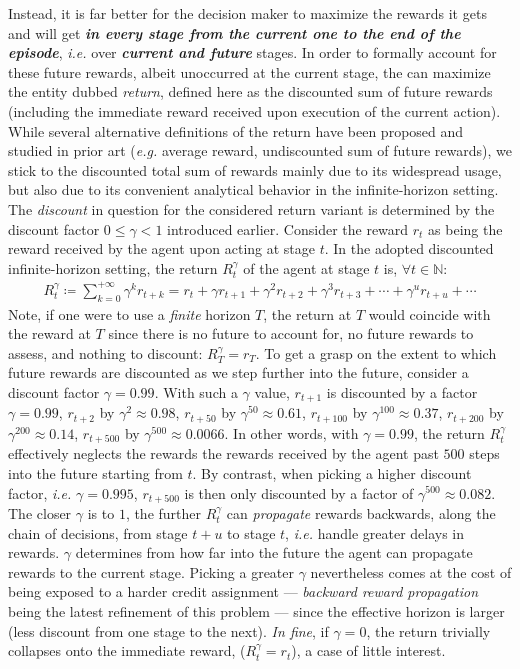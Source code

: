 Instead, it is far better for the decision maker
to maximize the rewards it gets and will get
\textbf{\emph{in every stage from the current one to the end of the episode}},
\textit{i.e.} over \textbf{\emph{current and future}} stages.
In order to formally account for these future rewards, albeit unoccurred at the current stage,
the can maximize the entity dubbed \emph{return}, defined here as the
discounted sum of future rewards (including the immediate reward received upon execution of the current action).
While several alternative definitions of the return have been proposed and studied in prior art
(\textit{e.g.} average reward, undiscounted sum of future rewards),
we stick to the discounted total sum of rewards mainly due to its widespread usage,
but also due to its convenient analytical behavior in the infinite-horizon setting.
The \textit{discount} in question for the considered return variant
is determined by the discount factor $0 \leq \gamma < 1$ introduced earlier.
Consider the reward $r_t$ as being the reward received by the agent upon acting at stage $t$.
In the adopted discounted infinite-horizon setting,
the return $R_t^\gamma$ of the agent at stage $t$ is,
$\forall t \in \mathbb{N}$:
\begin{align}
R_t^\gamma
\coloneqq
\sum_{k=0}^{+\infty} \gamma^k r_{t+k}
= r_t + \gamma r_{t+1} + \gamma^2 r_{t+2} + \gamma^3 r_{t+3} + \cdots + \gamma^u r_{t+u} +\cdots
\label{intro:returndef}
\end{align}
Note, if one were to use a \emph{finite} horizon $T$, the return at $T$ would coincide with the reward at $T$
since there is no future to account for, no future rewards to assess,
and nothing to discount: $R_T^\gamma = r_T$.
To get a grasp on the extent to which future rewards are discounted as we step further into the future,
consider a discount factor $\gamma=0.99$. With such a $\gamma$ value,
$r_{t+1}$ is discounted by a factor $\gamma=0.99$,
$r_{t+2}$ by $\gamma^2 \approx 0.98$,
$r_{t+50}$ by $\gamma^{50} \approx 0.61$,
$r_{t+100}$ by $\gamma^{100} \approx 0.37$,
$r_{t+200}$ by $\gamma^{200} \approx 0.14$,
$r_{t+500}$ by $\gamma^{500} \approx 0.0066$.
In other words, with $\gamma=0.99$, the return $R_t^\gamma$ effectively neglects the rewards
the rewards received by the agent past $500$ steps into the future starting from $t$.
By contrast, when picking a higher discount factor, \textit{i.e.} $\gamma=0.995$,
$r_{t+500}$ is then only discounted by a factor of $\gamma^{500} \approx 0.082$.
The closer $\gamma$ is to $1$, the further $R_t^\gamma$ can \emph{propagate} rewards
backwards, along the chain of decisions, from stage $t+u$ to stage $t$,
\textit{i.e.} handle greater delays in rewards. $\gamma$ determines from how far into the future the agent
can propagate rewards to the current stage.
Picking a greater $\gamma$ nevertheless comes at the cost of being exposed to a harder credit assignment
--- \textit{backward reward propagation} being the latest refinement of this problem ---
since the effective horizon is larger
(less discount from one stage to the next).
\textit{In fine}, if $\gamma=0$, the return trivially collapses onto the immediate reward,
($R_t^\gamma = r_t$), a case of little interest.

